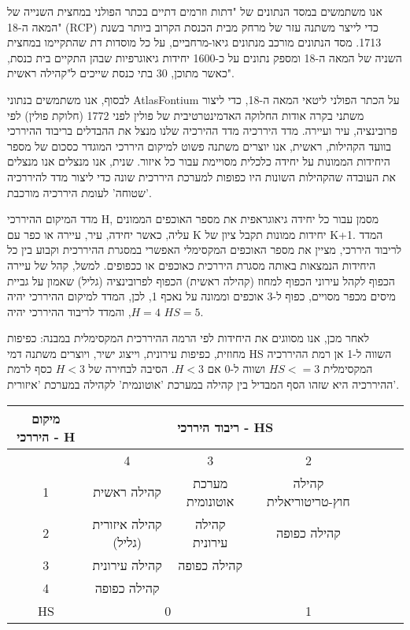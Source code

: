  אנו משתמשים במסד הנתונים של "דתות וזרמים דתיים בכתר הפולני במחצית השנייה של המאה ה-18"  (RCP) \cite{szady_geografia_2023} כדי לייצר משתנה עזר של מרחק מבית הכנסת הקרוב ביותר בשנת 1713. מסד הנתונים מורכב מנתונים גיאו-מרחביים, על כל מוסדות דת שהתקיימו במחצית השניה של המאה ה-18 ומספק נתונים על כ-1600 יחידות גיאוגרפיות שבהן התקיים בית כנסת, כאשר מתוכן, 30 בתי כנסת שייכים ל"קהילה ראשית".

לבסוף, אנו משתמשים בנתוני AtlasFontium  על הכתר הפולני ליטאי המאה ה-18, כדי ליצור משתני בקרה אודות החלוקה האדמינטרטיבית של פולין לפני 1772 (חלוקת פולין) לפי פרובינציה, עיר ועיירה. 
מדד היררכיה
מדד ההירכיה שלנו מנצל את ההבדלים בריבוד ההיררכי בוועד הקהילות, ראשית, אנו יוצרים משתנה פשוט למיקום היררכי המוגדר כסכום של מספר היחידות הממונות על יחידה כלכלית מסויימת עבור כל איזור. שנית, אנו מנצלים אנו מנצלים את העובדה שהקהילות השונות היו כפופות למערכת היררכית שונה כדי ליצור מדד להיררכיה 'שטוחה' לעומת היררכיה מורכבת. 


מדד המיקום ההיררכי H, מסמן עבור כל יחידה גיאוגראפית את מספר האוכפים הממונים עליה, כאשר יחידה, עיר, עיירה או כפר עם K יחידות ממונות תקבל ציון של K+1.
המדד לריבוד היררכי, מציין את מספר האוכפים המקסימלי האפשרי במסגרת ההיררכית וקבוע בין כל היחידות הנמצאות באותה מסגרת היררכית כאוכפים או ככפופים.
למשל, קהל של עיירה הכפוף לקהל עירוני הכפוף למחוז (קהילה ראשית) הכפוף לפרובינציה (גליל) שאמון על גביית מיסים מכפר מסויים, כפוף ל-3 אוכפים וממונה על נאכף 1, לכן, המדד למיקום ההיררכי יהיה $H=4$, והמדד לריבוד ההיררכי יהיה $HS=5$.

לאחר מכן, אנו מסווגים את היחידות לפי הרמה ההיררכית המקסימלית במבנה: כפיפות מחוזית, כפיפות עירונית, וייצוג ישיר, ויוצרים משתנה דמי HS השווה ל-1 אן רמת ההיררכיה המקסימלית $HS<=3$ ושווה ל-0 אם $H<3$. הסיבה לבחירה של $H<3$ כסף לרמת ההיררכיה היא שזהו הסף המבדיל בין קהילה במערכת 'אוטונמית' לקהילה במערכת 'איזורית'. 


\begin{table}[h]
    \centering
    \renewcommand{\arraystretch}{1.4}
    \begin{tabular}{|c c c c|>{\centering\arraybackslash}m{4cm}|>{\centering\arraybackslash}m{4cm}|>{\centering\arraybackslash}m{4cm}|}
   \hline
    \textbf{מיקום היררכי - H} & \multicolumn{3}{c|}{\textbf{ריבוד היררכי - HS}}  \\ \hline
     & 4 & 3 & 2 \\    \hline
    1 & קהילה ראשית & מערכת אוטונומית & קהילה חוץ-טריטוריאלית \\
    
    2 & קהילה איזורית (גליל) & קהילה עירונית & קהילה כפופה \\
    
    3 & קהילה עירונית & קהילה כפופה & \\
    
    4 & קהילה כפופה & & \\
    \hline
    HS & \multicolumn{2}{c}{0} & 1 \\ \hline
\end{tabular}

    \end{table}
        

